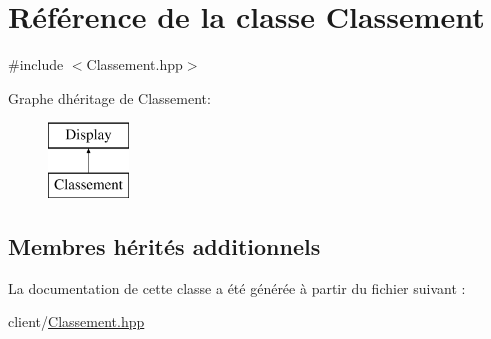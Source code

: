 \hypertarget{classClassement}{}\section{Référence de la classe Classement}
\label{classClassement}


{\ttfamily \#include $<$Classement.\+hpp$>$}

Graphe d\textquotesingle{}héritage de Classement\+:\begin{figure}[H]
\begin{center}
\leavevmode
\includegraphics[height=2.000000cm]{classClassement}
\end{center}
\end{figure}
\subsection*{Membres hérités additionnels}


La documentation de cette classe a été générée à partir du fichier suivant \+:\begin{DoxyCompactItemize}
\item 
client/\hyperlink{client_2Classement_8hpp}{Classement.\+hpp}\end{DoxyCompactItemize}

